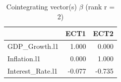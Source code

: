 \begin{table}

\caption{\label{tab:vecm-loadings}Cointegrating vector(s) $\beta$  (rank r = 2)}
\centering
\begin{tabular}[t]{lrr}
\toprule
  & ECT1 & ECT2\\
\midrule
GDP\_Growth.l1 & 1.000 & 0.000\\
Inflation.l1 & 0.000 & 1.000\\
Interest\_Rate.l1 & -0.077 & -0.735\\
\bottomrule
\end{tabular}
\end{table}
